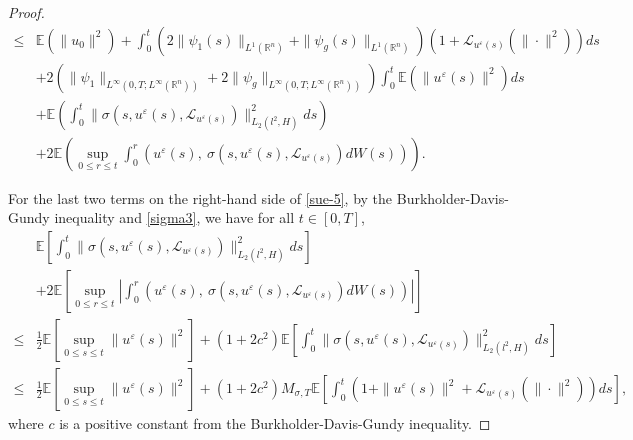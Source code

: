 \documentclass[11pt]{article}
\numberwithin{equation}{section}
\theoremstyle{plain}
\def\leq{\leqslant}
\begin{document}
\begin{proof}
\begin{align}
    \leq &
    \mathbb{E} \left (\| u_0 \|^2
    \right )
    +  \int_0^t
    ( 2\| \psi_1(s) \|_{L^1(\mathbb{R}^n)}
    +\| \psi_g(s) \|_{L^1(\mathbb{R}^n)}
    )
    \left( 1 + \mathcal{L}_{u^\varepsilon(s)}
    (\|\cdot\|^2) \right) ds  \nonumber \\
    &
    +  2 \left(
    \|\psi_1\|_{L^\infty(0,T; L^\infty(\mathbb{R}^n))}
    + 2 \|\psi_g\|_{L^\infty(0,T; L^\infty(\mathbb{R}^n))} \right) \int_0^t
    \mathbb{E} \left (
     \| u^\varepsilon(s) \|^2
     \right )  ds  \nonumber \\
    & +
    \mathbb{E} \left (
    \int_0^t \| \sigma(s, u^\varepsilon(s), \mathcal{L}_{u^\varepsilon(s)} ) \|_{L_2(l^2,H)}^2 ds
    \right ) \nonumber \\
    &
    + 2
    \mathbb{E} \left (
    \sup_{0\le r \le t}
     \int_0^r \left( u^\varepsilon(s),\ \sigma(s, u^\varepsilon(s), \mathcal{L}_{u^\varepsilon(s)} )dW(s) \right)
     \right ).
\end{align}



 For the last two terms on the right-hand side of \eqref{sue-5},
 by the Burkholder-Davis-Gundy inequality and \eqref{sigma3},
 we have for all $ t \in [0,T]$,
\begin{align} \label{sue-6}
       & \mathbb{E}
                       \left[ \int_0^t \| \sigma(s, u^\varepsilon(s), \mathcal{L}_{u^\varepsilon(s)} ) \|_{L_2(l^2,H)}^2 ds
                       \right]  \nonumber \\
       & + 2 \mathbb{E}
                        \left[ \sup_{
                            0\le r \le t  }
                                \left| \int_0^r
                                                \left( u^\varepsilon(s),\
                                                       \sigma(s, u^\varepsilon(s), \mathcal{L}_{u^\varepsilon(s)} ) dW(s)
                                                \right)
                                \right|
                        \right]  \nonumber \\
  \leq & \frac{1}{2} \mathbb{E} \left[ \sup_{0 \leq s \leq t} \|u^\varepsilon (s)\|^2 \right]
            + (1+2c^2) \mathbb{E}
                                 \left[ \int_0^t \| \sigma(s, u^\varepsilon (s), \mathcal{L}_{u^\varepsilon(s)} ) \|_{L_2(l^2,H)}^2 ds
                                 \right]  \nonumber \\
  \leq & \frac{1}{2} \mathbb{E}
                                \left[ \sup_{0 \leq s \leq t} \|u^\varepsilon(s)\|^2
                                \right]
         + (1+2c^2) M_{\sigma,T}
                                \mathbb{E}
                                 \left[ \int_0^t
                                              \left( 1 + \|u^\varepsilon(s)\|^2
                                                       + \mathcal{L}_{u^\varepsilon(s)}(\|\cdot\|^2)
                                              \right)
                                        ds
                                 \right],
  \end{align}
  where $c$ is a positive constant from the Burkholder-Davis-Gundy inequality.


\end{proof}
\end{document}

